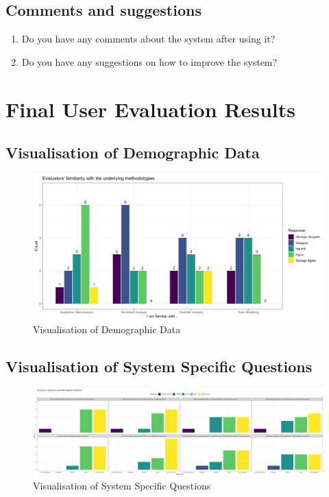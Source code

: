 \documentclass{l4proj}
\begin{document}
\begin{appendices}
\section{Comments and suggestions}

\begin{enumerate}
    \item Do you have any comments about the system after using it?
    \item Do you have any suggestions on how to improve the system?
\end{enumerate}


 \chapter{Final User Evaluation Results}
 \label{appendix:eval_results}

 \section{Visualisation of Demographic Data}

 \begin{figure}[H]
    \centering
    \includegraphics[width=1\linewidth]{images/demographics.png}
    \caption{Visualisation of Demographic Data}
    \label{fig:demographics_visual} 
\end{figure}

 \section{Visualisation of System Specific Questions}
  \begin{figure}[H]
    \centering
    \includegraphics[width=550pt, angle=90]{images/system_specific_res.png}
    \caption{Visualisation of System Specific Questions}
    \label{fig:system_specific_visuals} 
\end{figure}


\end{appendices}
\end{document}
